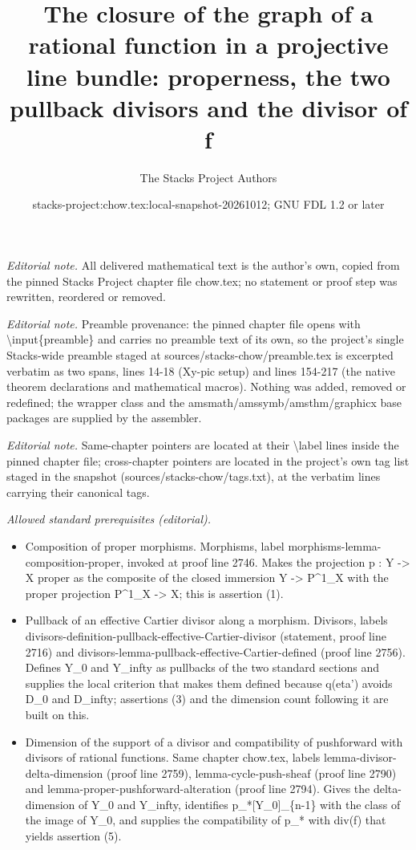 \documentclass[10pt,a4paper]{amsart}
\title{The closure of the graph of a rational function in a projective line bundle: properness, the two pullback divisors and the divisor of f}
\author{The Stacks Project Authors}
\date{stacks-project:chow.tex:local-snapshot-20261012; GNU FDL 1.2 or later}
\theoremstyle{plain}
\theoremstyle{definition}
\theoremstyle{remark}
\numberwithin{equation}{subsection}
\begin{document}
\maketitle
\noindent\textit{Editorial note.} All delivered mathematical text is the author's own, copied from the pinned Stacks Project chapter file chow.tex; no statement or proof step was rewritten, reordered or removed.\par\medskip
\noindent\textit{Editorial note.} Preamble provenance: the pinned chapter file opens with \textbackslash{}input\{preamble\} and carries no preamble text of its own, so the project's single Stacks-wide preamble staged at sources/stacks-chow/preamble.tex is excerpted verbatim as two spans, lines 14-18 (Xy-pic setup) and lines 154-217 (the native theorem declarations and mathematical macros). Nothing was added, removed or redefined; the wrapper class and the amsmath/amssymb/amsthm/graphicx base packages are supplied by the assembler.\par\medskip
\noindent\textit{Editorial note.} Same-chapter pointers are located at their \textbackslash{}label lines inside the pinned chapter file; cross-chapter pointers are located in the project's own tag list staged in the snapshot (sources/stacks-chow/tags.txt), at the verbatim lines carrying their canonical tags.\par\medskip
\noindent\textit{Allowed standard prerequisites (editorial).}\begin{itemize}
\item Composition of proper morphisms. Morphisms, label morphisms-lemma-composition-proper, invoked at proof line 2746. Makes the projection p : Y -> X proper as the composite of the closed immersion Y -> P\textasciicircum{}1\_X with the proper projection P\textasciicircum{}1\_X -> X; this is assertion (1).
\item Pullback of an effective Cartier divisor along a morphism. Divisors, labels divisors-definition-pullback-effective-Cartier-divisor (statement, proof line 2716) and divisors-lemma-pullback-effective-Cartier-defined (proof line 2756). Defines Y\_0 and Y\_infty as pullbacks of the two standard sections and supplies the local criterion that makes them defined because q(eta') avoids D\_0 and D\_infty; assertions (3) and the dimension count following it are built on this.
\item Dimension of the support of a divisor and compatibility of pushforward with divisors of rational functions. Same chapter chow.tex, labels lemma-divisor-delta-dimension (proof line 2759), lemma-cycle-push-sheaf (proof line 2790) and lemma-proper-pushforward-alteration (proof line 2794). Gives the delta-dimension of Y\_0 and Y\_infty, identifies p\_*[Y\_0]\_\{n-1\} with the class of the image of Y\_0, and supplies the compatibility of p\_* with div(f) that yields assertion (5).
\end{itemize}\medskip
\end{document}

